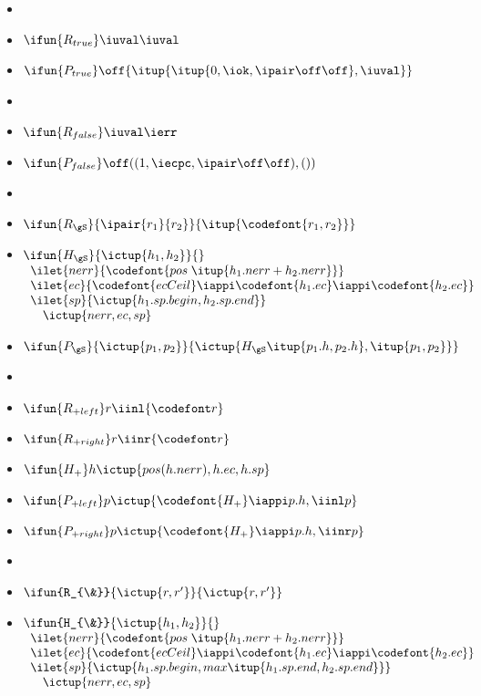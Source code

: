 \begin{figure}
\small
\begin{itemize}
\renewcommand{\labelitemi}{}

\item %
\item $\ifun {R_{true}} \iuval \iuval$
\item $\ifun {P_{true}} \off {\itup{\itup{0,\iok,\ipair \off \off},\iuval}}$

\item %
\item $\ifun {R_{false}} \iuval \ierr$
\item $\ifun {P_{false}} \off ((1,\iecpc,\ipair \off \off),())$

\item %
\item $\ifun {R_{\gS}} {\ipair {r_1} {r_2}} {\itup {\codefont{r_1,r_2}}}$
\item $\ifun{H_{\gS}} {\ictup{h_1,h_2}}{}$ \\
  $\begin{array}{l}
    \ilet {nerr} {\codefont{pos \; \itup{{h_1}.{nerr} + {h_2}.{nerr}}}}\\
    \ilet {ec} {\codefont{ecCeil} \iappi \codefont{h_1.ec} \iappi \codefont{h_2.ec}} \\
    \ilet {sp} {\ictup{h_1.sp.begin, h_2.sp.end}} \\
    \quad \ictup {nerr,ec,sp}
  \end{array}$

\item $\ifun {P_{\gS}} {\ictup{p_1, p_2}} {\ictup {H_{\gS} \itup{p_1.h,p_2.h},\itup{p_1,p_2}}}$

\item %
\item $\ifun {R_{+left}} r {\iinl {\codefont r}}$
\item $\ifun {R_{+right}} r {\iinr {\codefont r}}$

\item $\ifun {H_+} h {\ictup{pos(h.nerr),h.ec,h.sp}}$
\item $\ifun {P_{+left}} p {\ictup{\codefont{H_+} \iappi p.h, \iinl p}}$
\item $\ifun {P_{+right}} p {\ictup{\codefont{H_+} \iappi p.h, 
      \iinr  p}}$

\item %
\item $\ifun {R_{\&}} {\ictup {r,r'}} {\ictup {r,r'}}$
\item $\ifun {H_{\&}} {\ictup {h_1, h_2}} {}$ \\
    $\begin{array}{l}
      \ilet {nerr} {\codefont{pos \; \itup{{h_1}.{nerr} + {h_2}.{nerr}}}}\\
      \ilet {ec} {\codefont{ecCeil} \iappi \codefont{h_1.ec} \iappi \codefont{h_2.ec}} \\
      \ilet {sp} {\ictup{h_1.sp.begin, max \itup{h_1.sp.end, h_2.sp.end}}} \\
      \quad \ictup {nerr,ec,sp}
    \end{array}$


\end{itemize}
\end{figure}
